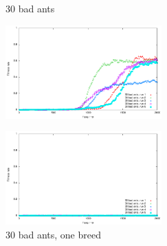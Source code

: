 \documentclass[titlepage, a4paper, 12pt]{article}
\begin{document}
\begin{figure}
  \hspace{0.5cm}

  \begin{minipage}[b]{0.5\linewidth}
    \centering
    \caption{30 bad ants }\label{fig:images/graph30}
    \includegraphics[width=6cm]{images/graph30.pdf}
  \end{minipage}
  \begin{minipage}[b]{0.5\linewidth}
    \centering
    \caption{30 bad ants, one breed }\label{fig:images/graph30oneBreed}
    \includegraphics[width=6cm]{images/graph30oneBreed.pdf}
  \end{minipage}
  
\end{figure}
\end{document}
